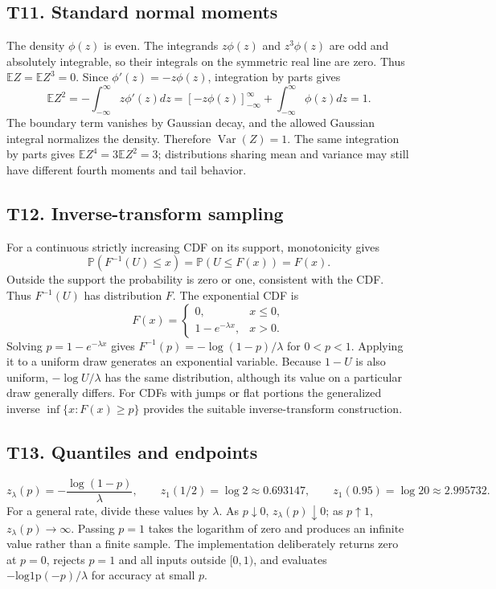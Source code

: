 \documentclass[11pt,a4paper]{article}
\newcommand{\E}{\mathbb E}\newcommand{\Pp}{\mathbb P}
\DeclareMathOperator{\Var}{Var}\DeclareMathOperator{\Cov}{Cov}
\begin{document}
\subsection{T11. Standard normal moments}
The density $\phi(z)$ is even. The integrands $z\phi(z)$ and $z^3\phi(z)$ are odd and absolutely integrable, so their integrals on the symmetric real line are zero. Thus $\E Z=\E Z^3=0$.
Since $\phi'(z)=-z\phi(z)$, integration by parts gives
\[
\E Z^2=-\int_{-\infty}^\infty z\phi'(z)dz
=[-z\phi(z)]_{-\infty}^{\infty}+\int_{-\infty}^\infty\phi(z)dz=1.
\]
The boundary term vanishes by Gaussian decay, and the allowed Gaussian integral normalizes the density. Therefore $\Var(Z)=1$. The same integration by parts gives $\E Z^4=3\E Z^2=3$; distributions sharing mean and variance may still have different fourth moments and tail behavior.

\subsection{T12. Inverse-transform sampling}
For a continuous strictly increasing CDF on its support, monotonicity gives
\[
\Pp(F^{-1}(U)\leq x)=\Pp(U\leq F(x))=F(x).
\]
Outside the support the probability is zero or one, consistent with the CDF. Thus $F^{-1}(U)$ has distribution $F$.
The exponential CDF is
\[
F(x)=\begin{cases}0,&x\leq0,\\1-e^{-\lambda x},&x>0.\end{cases}
\]
Solving $p=1-e^{-\lambda x}$ gives $F^{-1}(p)=-\log(1-p)/\lambda$ for $0<p<1$. Applying it to a uniform draw generates an exponential variable. Because $1-U$ is also uniform, $-\log U/\lambda$ has the same distribution, although its value on a particular draw generally differs. For CDFs with jumps or flat portions the generalized inverse $\inf\{x:F(x)\geq p\}$ provides the suitable inverse-transform construction.

\subsection{T13. Quantiles and endpoints}
\[
z_\lambda(p)=-\frac{\log(1-p)}\lambda,\qquad
z_1(1/2)=\log2\approx0.693147,\qquad
z_1(0.95)=\log20\approx2.995732.
\]
For a general rate, divide these values by $\lambda$. As $p\downarrow0$, $z_\lambda(p)\downarrow0$; as $p\uparrow1$, $z_\lambda(p)\to\infty$. Passing $p=1$ takes the logarithm of zero and produces an infinite value rather than a finite sample. The implementation deliberately returns zero at $p=0$, rejects $p=1$ and all inputs outside $[0,1)$, and evaluates $-\mathrm{log1p}(-p)/\lambda$ for accuracy at small $p$.
\end{document}
